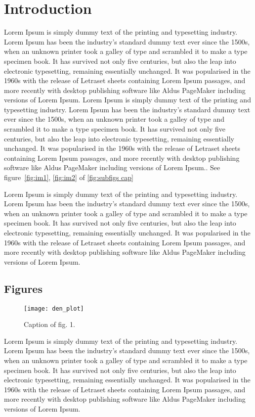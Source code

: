 \chapter{Introduction}\label{ch:ch1}
Lorem Ipsum is simply dummy text of the printing and typesetting industry. 
Lorem Ipsum has been the industry's standard dummy text ever since the 1500s, 
when an unknown printer took a galley of type and scrambled it to make a type 
specimen book. It has survived not only five centuries, but also the leap into 
electronic typesetting, remaining essentially unchanged. It was popularised in 
the 1960s with the release of Letraset sheets containing Lorem Ipsum passages, 
and more recently with desktop publishing software like Aldus PageMaker 
including versions of Lorem Ipsum.
Lorem Ipsum is simply dummy text of the printing and typesetting industry. 
Lorem Ipsum has been the industry's standard dummy text ever since the 1500s, 
when an unknown printer took a galley of type and scrambled it to make a type 
specimen book. It has survived not only five centuries, but also the leap into 
electronic typesetting, remaining essentially unchanged. It was popularised in 
the 1960s with the release of Letraset sheets containing Lorem Ipsum passages, 
and more recently with desktop publishing software like Aldus PageMaker 
including versions of Lorem Ipsum.. See figure~\ref{fig:im1}, \ref{fig:im2} of 
\ref{fig:subfigs cap}

Lorem Ipsum is simply dummy text of the printing and typesetting industry. 
Lorem Ipsum has been the industry's standard dummy text ever since the 1500s, 
when an unknown printer took a galley of type and scrambled it to make a type 
specimen book. It has survived not only five centuries, but also the leap into 
electronic typesetting, remaining essentially unchanged. It was popularised in 
the 1960s with the release of Letraset sheets containing Lorem Ipsum passages, 
and more recently with desktop publishing software like Aldus PageMaker 
including versions of Lorem Ipsum.

\section{Figures}
\begin{figure}
	\centering
	\texttt{[image: den\_plot]}
	\caption{Caption of fig. 1.}
	\label{fig:image2}
\end{figure}

Lorem Ipsum is simply dummy text of the printing and typesetting industry. 
Lorem Ipsum has been the industry's standard dummy text ever since the 1500s, 
when an unknown printer took a galley of type and scrambled it to make a type 
specimen book. It has survived not only five centuries, but also the leap into 
electronic typesetting, remaining essentially unchanged. It was popularised in 
the 1960s with the release of Letraset sheets containing Lorem Ipsum passages, 
and more recently with desktop publishing software like Aldus PageMaker 
including versions of Lorem Ipsum.
